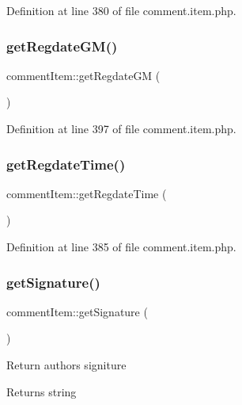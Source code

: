 Definition at line 380 of file comment.\+item.\+php.

\mbox{\label{classcommentItem_ae5f0203691b6d16a2d99ae40d67adb3f}} 
\subsubsection{\texorpdfstring{get\+Regdate\+G\+M()}{getRegdateGM()}}
{\footnotesize\ttfamily comment\+Item\+::get\+Regdate\+GM (\begin{DoxyParamCaption}{ }\end{DoxyParamCaption})}



Definition at line 397 of file comment.\+item.\+php.

\mbox{\label{classcommentItem_adb5754f10a245c54a0beb4f6fb22f0e3}} 
\subsubsection{\texorpdfstring{get\+Regdate\+Time()}{getRegdateTime()}}
{\footnotesize\ttfamily comment\+Item\+::get\+Regdate\+Time (\begin{DoxyParamCaption}{ }\end{DoxyParamCaption})}



Definition at line 385 of file comment.\+item.\+php.

\mbox{\label{classcommentItem_a97eea3e5359c0ffe84db781d5e5fbff6}} 
\subsubsection{\texorpdfstring{get\+Signature()}{getSignature()}}
{\footnotesize\ttfamily comment\+Item\+::get\+Signature (\begin{DoxyParamCaption}{ }\end{DoxyParamCaption})}

Return author\textquotesingle{}s signiture \begin{DoxyReturn}{Returns}
string 
\end{DoxyReturn}


